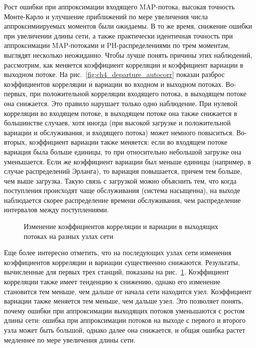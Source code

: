 Рост ошибки при аппроксимации входящего MAP-потока, высокая точность Монте-Карло и улучшение приближений по мере увеличения числа аппроксимиируемых моментов были ожидаемы. В то же время, снижение ошибки при увеличении длины сети, а также практически идентичная точность при аппроксимации MAP-потоками и PH-распределениями по трем моментам, выглядят несколько неожиданно. Чтобы лучше понять причины этих наблюдений, рассмотрим, как меняется коэффициент корреляции и коэффициент вариации в выходном потоке. На рис.~\ref{fig:ch4_departure_autocorr} показан разброс коэффициентов корреляции и вариации во входном и выходном потоках. Во-первых, при положительной корреляции входящего потока, в выходящем потоке она снижается. Это правило нарушает только одно наблюдение. При нулевой корреляции во входящем потоке, в выходящем потоке она также снижается в большинстве случаев, хотя иногда (при высокой загрузке и положительной вариации и обслуживания, и входящего потока) может немного повыситься. Во-вторых, коэффициент вариации также меняется: если во входящем потоке вариация была больше единицы, то при относительно небольшой загрузке она уменьшается. Если же коэффициент вариации был меньше единицы (например, в случае распределений Эрланга), то вариация повышается, причем тем больше, чем выше загрузка. Такую связь с загрузкой можно объяснить тем, что когда поступления происходят чаще обслуживания (система насыщенна), на выходе наблюдается скорее распределение времени обслуживания, чем распределение интервалов между поступлениями.

\begin{figure}[h]
  \caption{Изменение коэффициентов корреляции и вариации в выходящих потоках на разных узлах сети}
  \label{fig:ch4_net_departure_autocorr}
\end{figure}

Еще более интересно отметить, что на последующих узлах сети изменения коэффициентов корреляции и вариации существеенно снижаются. Результаты, вычисленные для первых трех станций, показаны на рис.~\ref{fig:ch4_net_departure_autocorr}. Коэффициент корреляции также имеет тенденцию к снижению, однако его изменение становится тем меньше, чем дальше от начала сети находится узел. Коэффициент вариации также меняется тем меньше, чем дальше узел. Это позволяет понять, почему ошибки при аппроксимации выходящих потоков уменьшаются с ростом длины сети: ошибка при аппроксимации потоков на выходе с первого и второго узла может быть большой, однако далее она снижается, и общая ошибка растет медленнее по мере увеличения длины сети.

